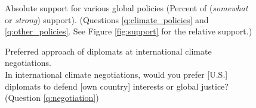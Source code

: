 \documentclass[12pt,english]{article}
\begin{document}
\begin{figure}[h!] %
    \caption[Absolute support for various global policies]{Absolute support for various global policies (Percent of (\textit{somewhat} or \textit{strong}) support). (Questions \ref{q:climate_policies} and \ref{q:other_policies}. See Figure \ref{fig:support} for the relative support.)}\label{fig:support_likert_positive}
\end{figure}



\begin{figure}[h!]
    \caption[Preferred approach for international climate negotiations]{Preferred approach of diplomats at international climate negotiations. \\ In international climate negotiations, would you prefer [U.S.] diplomats to defend [own country] interests or global justice? (Question \ref{q:negotiation})}\label{fig:negotiation}
\end{figure}
\end{document}
